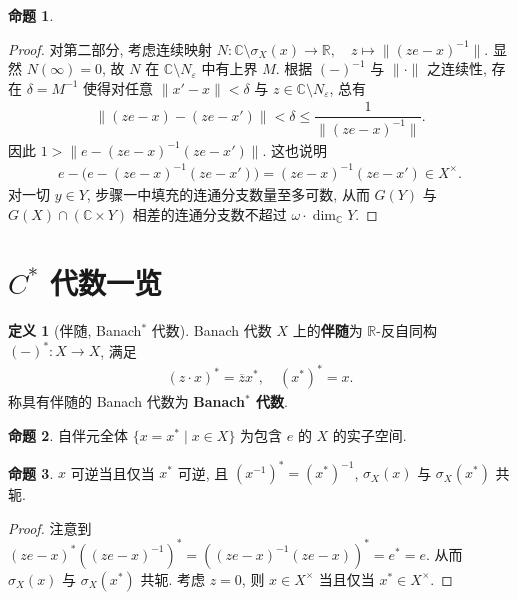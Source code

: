 \documentclass{MainStyle}
\theoremstyle{definition}
\theoremstyle{definition}
\theoremstyle{definition}
\newtheorem{definition}{定义}
\theoremstyle{definition}
\newtheorem{proposition}{命题}
\theoremstyle{definition}
\theoremstyle{definition}
\theoremstyle{definition}
\theoremstyle{remark}
\theoremstyle{remark}
\begin{document}
\begin{proposition}
\begin{proof}
        对第二部分, 考虑连续映射 $N:\mathbb C\setminus \sigma_X(x)\to \mathbb R, \quad z\mapsto \|(ze-x)^{-1}\|$. 显然 $N(\infty)=0$, 故 $N$ 在 $\mathbb C\setminus N_\varepsilon$ 中有上界 $M$. 根据 $(-)^{-1}$ 与 $\|\cdot\|$ 之连续性, 存在 $\delta =M^{-1}$ 使得对任意 $\|x'-x\|<\delta$ 与 $z\in \mathbb C\setminus N_\varepsilon$, 总有
        \begin{align*}
            \|(ze-x)-(ze-x')\|<\delta \leq \dfrac{1}{\|(ze-x)^{-1}\|}.
        \end{align*}
        因此 $1>\|e-(ze-x)^{-1}(ze-x')\|$. 这也说明
        \begin{align*}
            e-\Big(e-(ze-x)^{-1}(ze-x')\Big)=(ze-x)^{-1}(ze-x')\in X^\times.
        \end{align*}
        对一切 $y\in Y$, 步骤一中填充的连通分支数量至多可数, 从而 $G(Y)$ 与 $G(X)\cap (\mathbb C\times Y)$ 相差的连通分支数不超过 $\omega \cdot \dim_{\mathbb C}Y$.
    \end{proof}
\end{proposition}

\section{$C^\ast$ 代数一览}

\begin{definition}[伴随, Banach$^\ast$ 代数]
    Banach 代数 $X$ 上的\textbf{伴随}为 $\mathbb R$-反自同构 $(-)^\ast:X\to X$, 满足
    \begin{align*}
        (z\cdot x)^\ast=\overline z x^\ast,\quad (x^\ast)^\ast=x.
    \end{align*}
    称具有伴随的 Banach 代数为 \textbf{Banach$^\ast$ 代数}.
\end{definition}

\begin{proposition}
    自伴元全体 $\{x=x^\ast\mid x\in X\}$ 为包含 $e$ 的 $X$ 的实子空间.
\end{proposition}

\begin{proposition}
    $x$ 可逆当且仅当 $x^\ast$ 可逆, 且 $(x^{-1})^\ast=(x^\ast)^{-1}$, $\sigma_X(x)$ 与 $\sigma_X(x^\ast)$ 共轭.
    \begin{proof}
        注意到 $(ze-x)^\ast ((ze-x)^{-1})^\ast=((ze-x)^{-1}(ze-x))^\ast=e^\ast=e$. 从而 $\sigma_X(x)$ 与 $\sigma_X(x^\ast)$ 共轭. 考虑 $z=0$, 则 $x\in X^\times$ 当且仅当 $x^\ast \in X^\times$.
    \end{proof}
\end{proposition}
\end{document}
